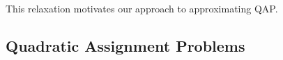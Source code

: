 \documentclass[10pt,journal,cspaper,compsoc]{IEEEtran}
\begin{document}
This relaxation motivates our approach to approximating QAP.

	
 

\subsection{Quadratic Assignment Problems} %
\label{ssub:linear_assignment_problems}

\end{document}
